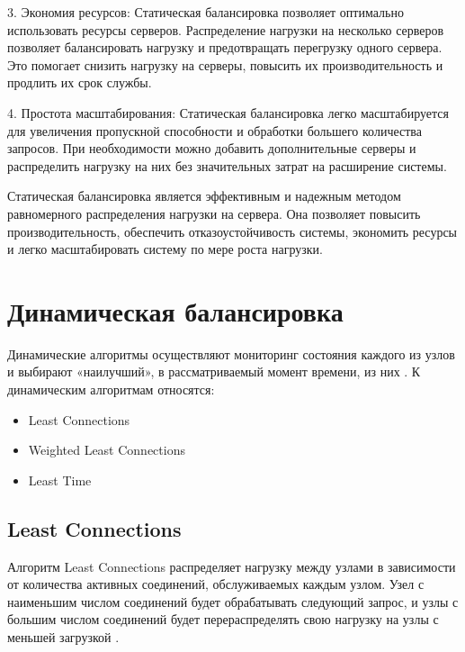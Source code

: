 3. Экономия ресурсов: Статическая балансировка позволяет оптимально использовать ресурсы серверов. Распределение нагрузки на несколько серверов позволяет балансировать нагрузку и предотвращать перегрузку одного сервера. Это помогает снизить нагрузку на серверы, повысить их производительность и продлить их срок службы.

4. Простота масштабирования: Статическая балансировка легко масштабируется для увеличения пропускной способности и обработки большего количества запросов. При необходимости можно добавить дополнительные серверы и распределить нагрузку на них без значительных затрат на расширение системы.

Статическая балансировка является эффективным и надежным методом равномерного распределения нагрузки на сервера. Она позволяет повысить производительность, обеспечить отказоустойчивость системы, экономить ресурсы и легко масштабировать систему по мере роста нагрузки.
\cite{6}

\section{Динамическая балансировка}
Динамические алгоритмы осуществляют мониторинг состояния каждого
из узлов и выбирают «наилучший», в рассматриваемый момент времени, из них \cite{webmanage}. К динамическим алгоритмам относятся:
\begin{itemize}
	\item Least Connections
	\item Weighted Least Connections
	\item Least Time
\end{itemize}
\subsection{Least Connections}
Алгоритм Least Connections распределяет нагрузку между узлами в зависимости от количества активных соединений, обслуживаемых каждым узлом. Узел с наименьшим числом соединений будет обрабатывать следующий запрос, и узлы с большим числом соединений будет перераспределять свою нагрузку на узлы с меньшей загрузкой \cite{leastconnection}. 


